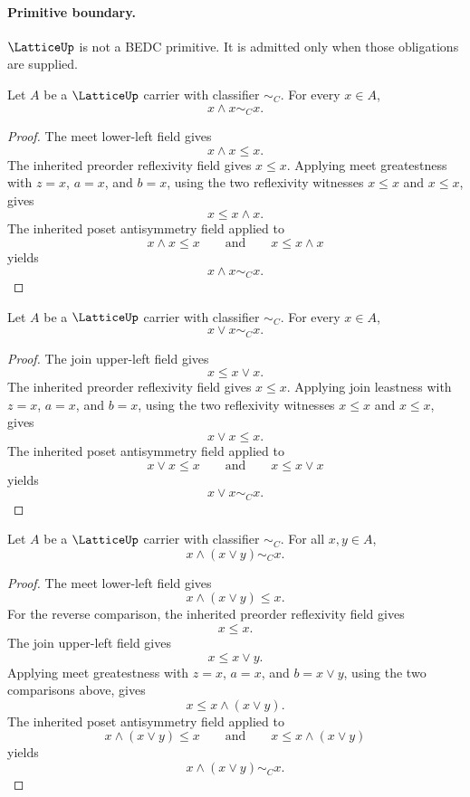 \paragraph{Primitive boundary.}
\(\LatticeUp\) is not a BEDC primitive. It is admitted only when those obligations are supplied.

\begin{lemma}
\label{lem:lattice-meet-idempotence-from-bounds}
Let \(A\) be a \(\LatticeUp\) carrier with classifier \(\sim_C\).
For every \(x\in A\),
$$
  x\wedge x \sim_C x .
$$
\end{lemma}
\begin{proof}
The meet lower-left field gives
$$
  x\wedge x \le x .
$$
The inherited preorder reflexivity field gives \(x\le x\). Applying meet greatestness with \(z=x\), \(a=x\), and \(b=x\), using the two reflexivity witnesses \(x\le x\) and \(x\le x\), gives
$$
  x\le x\wedge x .
$$
The inherited poset antisymmetry field applied to
$$
  x\wedge x\le x  \qquad\text{and}\qquad  x\le x\wedge x
$$
yields
$$
  x\wedge x\sim_C x .
$$
\end{proof}

\begin{lemma}
\label{lem:lattice-join-idempotence-from-bounds}
Let \(A\) be a \(\LatticeUp\) carrier with classifier \(\sim_C\).
For every \(x\in A\),
$$
  x\vee x \sim_C x .
$$
\end{lemma}
\begin{proof}
The join upper-left field gives
$$
  x\le x\vee x .
$$
The inherited preorder reflexivity field gives \(x\le x\). Applying join leastness with \(z=x\), \(a=x\), and \(b=x\), using the two reflexivity witnesses \(x\le x\) and \(x\le x\), gives
$$
  x\vee x\le x .
$$
The inherited poset antisymmetry field applied to
$$
  x\vee x\le x  \qquad\text{and}\qquad  x\le x\vee x
$$
yields
$$
  x\vee x\sim_C x .
$$
\end{proof}

\begin{lemma}
\label{lem:lattice-meet-absorption-from-bounds}
Let \(A\) be a \(\LatticeUp\) carrier with classifier \(\sim_C\).
For all \(x,y\in A\),
$$
  x\wedge(x\vee y)\sim_C x .
$$
\end{lemma}
\begin{proof}
The meet lower-left field gives
$$
  x\wedge(x\vee y)\le x .
$$
For the reverse comparison, the inherited preorder reflexivity field gives
$$
  x\le x .
$$
The join upper-left field gives
$$
  x\le x\vee y .
$$
Applying meet greatestness with \(z=x\), \(a=x\), and \(b=x\vee y\), using the two comparisons above, gives
$$
  x\le x\wedge(x\vee y).
$$
The inherited poset antisymmetry field applied to
$$
  x\wedge(x\vee y)\le x  \qquad\text{and}\qquad  x\le x\wedge(x\vee y)
$$
yields
$$
  x\wedge(x\vee y)\sim_C x .
$$
\end{proof}

